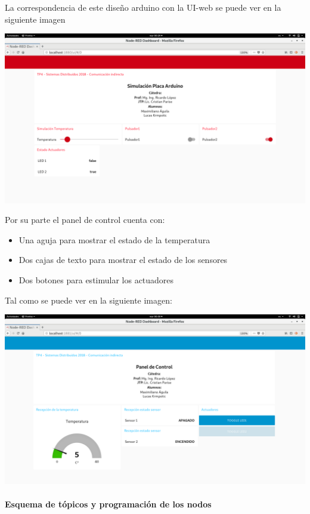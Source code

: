\documentclass[11pt]{article}
\makeatletter
\def\maxwidth{\ifdim\Gin@nat@width>\linewidth\linewidth
    \else\Gin@nat@width\fi}
\let\Oldincludegraphics\includegraphics
\renewcommand{\includegraphics}[1]{\Oldincludegraphics[width=.8\maxwidth]{#1}}
\makeatother
\begin{document}
    La correspondencia de este diseño arduino con la UI-web se puede ver en
la siguiente imagen

    \includegraphics{images/simulacion-placa.png}

    Por su parte el panel de control cuenta con:

\begin{itemize}
\item
  Una aguja para mostrar el estado de la temperatura
\item
  Dos cajas de texto para mostrar el estado de los sensores
\item
  Dos botones para estimular los actuadores
\end{itemize}

Tal como se puede ver en la siguiente imagen:

    \includegraphics{images/panel-control.png}

    \hypertarget{esquema-de-tuxf3picos-y-programaciuxf3n-de-los-nodos}{%
\paragraph{Esquema de tópicos y programación de los
nodos\\}\label{esquema-de-tuxf3picos-y-programaciuxf3n-de-los-nodos}}
\end{document}
